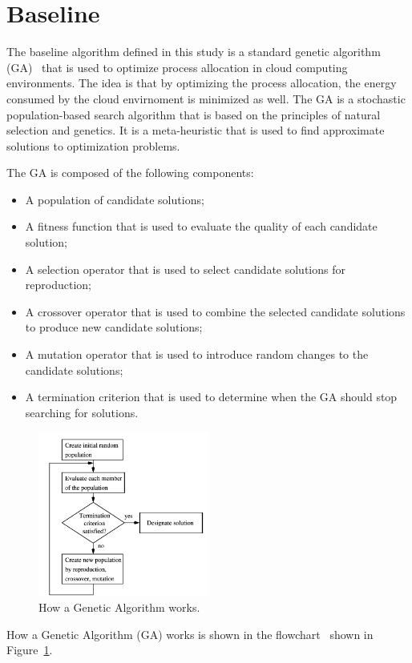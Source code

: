 \section{Baseline}\label{sect:baseline} 

The baseline algorithm defined in this study is a standard genetic algorithm (GA)~\cite{mitchell1998introduction} that is used to optimize 
process allocation in cloud computing environments. The idea is that by optimizing the process allocation, the energy consumed by the cloud envirnoment is minimized as well.
The GA is a stochastic population-based search algorithm that is based on the principles of natural selection and genetics.
It is a meta-heuristic that is used to find approximate solutions to optimization problems.~\cite{kramer2017genetic}

The GA is composed of the following components:
\begin{itemize}
    \item A population of candidate solutions;
    \item A fitness function that is used to evaluate the quality of each candidate solution;
    \item A selection operator that is used to select candidate solutions for reproduction;
    \item A crossover operator that is used to combine the selected candidate solutions to produce new candidate solutions;
    \item A mutation operator that is used to introduce random changes to the candidate solutions;
    \item A termination criterion that is used to determine when the GA should stop searching for solutions.
\end{itemize}

\begin{figure}[h]
    \centering
    \includegraphics[width=0.5\textwidth]{./resources/examples/GAWorkflow.png}
    \caption{How a Genetic Algorithm works.}
    \label{fig:baseline}
\end{figure}
How a Genetic Algorithm (GA) works is shown in the flowchart~\cite{gaworkflow} shown in Figure~\ref{fig:baseline}.

